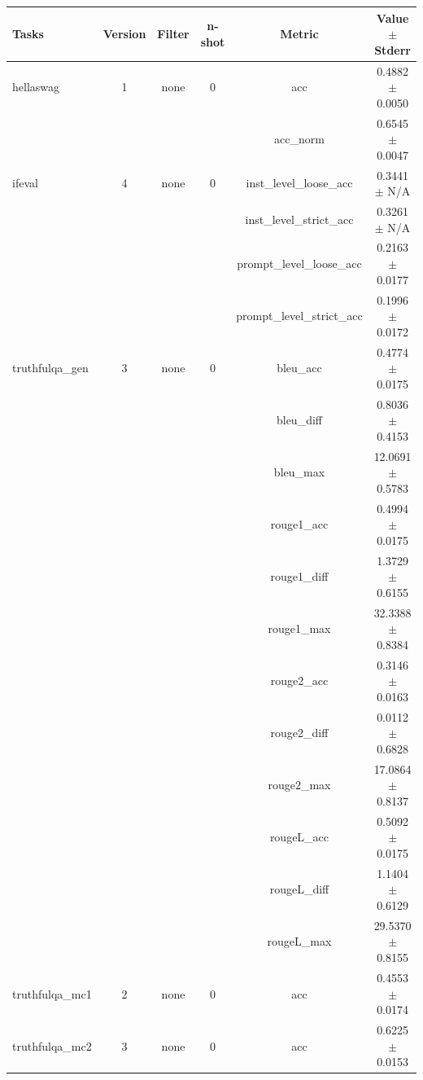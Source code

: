 \documentclass{ifacconf}
\begin{document}
    \vfill
	\clearpage
	\pagebreak

\begin{strip}
\begin{minipage}{\textwidth}
    \begin{table}[H]
    \centering
    \begin{tabular}{|l|c|c|c|c|c|}
    \hline
    \textbf{Tasks} & \textbf{Version} & \textbf{Filter} & \textbf{n-shot} & \textbf{Metric} & \textbf{Value} $\pm$ \textbf{Stderr} \\ \hline
    hellaswag & 1 & none & 0 & acc & 0.4882 $\pm$ 0.0050 \\ \hline
    & & & & acc\_norm & 0.6545 $\pm$ 0.0047 \\ \hline
    ifeval & 4 & none & 0 & inst\_level\_loose\_acc & 0.3441 $\pm$ N/A \\ \hline
    & & & & inst\_level\_strict\_acc & 0.3261 $\pm$ N/A \\ \hline
    & & & & prompt\_level\_loose\_acc & 0.2163 $\pm$ 0.0177 \\ \hline
    & & & & prompt\_level\_strict\_acc & 0.1996 $\pm$ 0.0172 \\ \hline
    truthfulqa\_gen & 3 & none & 0 & bleu\_acc & 0.4774 $\pm$ 0.0175 \\ \hline
    & & & & bleu\_diff & 0.8036 $\pm$ 0.4153 \\ \hline
    & & & & bleu\_max & 12.0691 $\pm$ 0.5783 \\ \hline
    & & & & rouge1\_acc & 0.4994 $\pm$ 0.0175 \\ \hline
    & & & & rouge1\_diff & 1.3729 $\pm$ 0.6155 \\ \hline
    & & & & rouge1\_max & 32.3388 $\pm$ 0.8384 \\ \hline
    & & & & rouge2\_acc & 0.3146 $\pm$ 0.0163 \\ \hline
    & & & & rouge2\_diff & 0.0112 $\pm$ 0.6828 \\ \hline
    & & & & rouge2\_max & 17.0864 $\pm$ 0.8137 \\ \hline
    & & & & rougeL\_acc & 0.5092 $\pm$ 0.0175 \\ \hline
    & & & & rougeL\_diff & 1.1404 $\pm$ 0.6129 \\ \hline
    & & & & rougeL\_max & 29.5370 $\pm$ 0.8155 \\ \hline
    truthfulqa\_mc1 & 2 & none & 0 & acc & 0.4553 $\pm$ 0.0174 \\ \hline
    truthfulqa\_mc2 & 3 & none & 0 & acc & 0.6225 $\pm$ 0.0153 \\ \hline
    \end{tabular}
    \label{tab:gemma2_q8}
    \end{table}


\end{minipage}
\end{strip}
\end{document}
